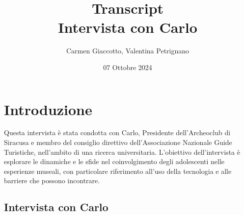\documentclass{article}
\title{Transcript \\ Intervista con Carlo}
\author{Carmen Giaccotto, Valentina Petrignano}
\date{07 Ottobre 2024}
\begin{document}
\maketitle

\section{Introduzione}
Questa intervista è stata condotta con Carlo, Presidente dell’Archeoclub di Siracusa e membro del consiglio direttivo dell’Associazione Nazionale Guide Turistiche, nell'ambito di una ricerca universitaria. L'obiettivo dell'intervista è esplorare le dinamiche e le sfide nel coinvolgimento degli adolescenti nelle esperienze museali, con particolare riferimento all'uso della tecnologia e alle barriere che possono incontrare.

\subsection{\textcolor{subsectioncolor}{Intervista con Carlo}}
\end{document}
